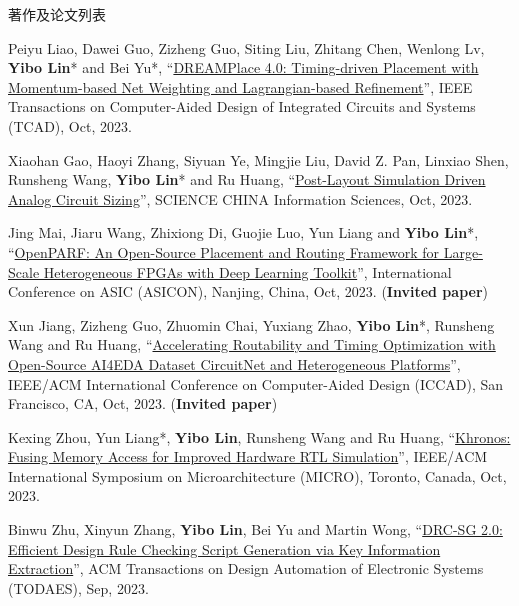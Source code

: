 \begin{rSection}{著作及论文列表}
\begin{description}[font=\normalfont, rightmargin=2em]
{}
            

\item[{[J128]}]{
        Peiyu Liao, Dawei Guo, Zizheng Guo, Siting Liu, Zhitang Chen, Wenlong Lv, \textbf{Yibo Lin}* and Bei Yu*, 
    ``\href{https://doi.org/10.1109/TCAD.2023.3240132}{DREAMPlace 4.0: Timing-driven Placement with Momentum-based Net Weighting and Lagrangian-based Refinement}'', 
    IEEE Transactions on Computer-Aided Design of Integrated Circuits and Systems (TCAD), Oct, 2023.
    
}
            

\item[{[J127]}]{
        Xiaohan Gao, Haoyi Zhang, Siyuan Ye, Mingjie Liu, David Z. Pan, Linxiao Shen, Runsheng Wang, \textbf{Yibo Lin}* and Ru Huang, 
    ``\href{https://doi.org/10.1007/s11432-022-3878-5}{Post-Layout Simulation Driven Analog Circuit Sizing}'', 
    SCIENCE CHINA Information Sciences, Oct, 2023.
    
}
            

\item[{[C126]}]{
        Jing Mai, Jiaru Wang, Zhixiong Di, Guojie Luo, Yun Liang and \textbf{Yibo Lin}*, 
    ``\href{https://doi.org/10.1109/ASICON58565.2023.10396248}{OpenPARF: An Open-Source Placement and Routing Framework for Large-Scale Heterogeneous FPGAs with Deep Learning Toolkit}'', 
    International Conference on ASIC (ASICON), Nanjing, China, Oct, 2023.
    (\textbf{Invited paper})
}
            

\item[{[C125]}]{
        Xun Jiang, Zizheng Guo, Zhuomin Chai, Yuxiang Zhao, \textbf{Yibo Lin}*, Runsheng Wang and Ru Huang, 
    ``\href{https://doi.org/10.1109/ICCAD57390.2023.10323938}{Accelerating Routability and Timing Optimization with Open-Source AI4EDA Dataset CircuitNet and Heterogeneous Platforms}'', 
    IEEE/ACM International Conference on Computer-Aided Design (ICCAD), San Francisco, CA, Oct, 2023.
    (\textbf{Invited paper})
}
            

\item[{[C124]}]{
        Kexing Zhou, Yun Liang*, \textbf{Yibo Lin}, Runsheng Wang and Ru Huang, 
    ``\href{https://doi.org/10.1145/3613424.3614301}{Khronos: Fusing Memory Access for Improved Hardware RTL Simulation}'', 
    IEEE/ACM International Symposium on Microarchitecture (MICRO), Toronto, Canada, Oct, 2023.
    
}
            

\item[{[J123]}]{
        Binwu Zhu, Xinyun Zhang, \textbf{Yibo Lin}, Bei Yu and Martin Wong, 
    ``\href{https://doi.org/10.1145/3594666}{DRC-SG 2.0: Efficient Design Rule Checking Script Generation via Key Information Extraction}'', 
    ACM Transactions on Design Automation of Electronic Systems (TODAES), Sep, 2023.
    
}
\end{description}
\end{rSection}
